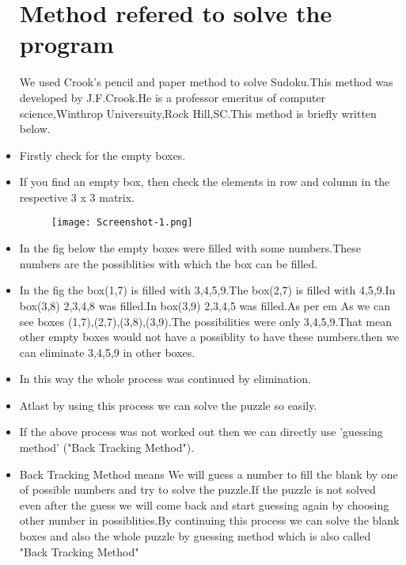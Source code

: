 \documentclass[12pt]{article}
\begin{document}
\begin{itemize}
\section{Method refered to solve the program}
 We used Crook's pencil and paper method to solve Sudoku.This method was developed by J.F.Crook.He is a professor emeritus of computer science,Winthrop Universuity,Rock Hill,SC.This method is briefly written below.
\item Firstly check for the empty boxes. 
\item If you find an empty box, then check  the elements in row and column in the respective 3 x 3 matrix.
\begin{center}
\begin{figure}[h]
\texttt{[image: Screenshot-1.png]}
\end{figure}
\end{center}
\item In the fig below the empty boxes were filled with some numbers.These numbers are the possiblities with which the box can be filled.
\item In the fig the box(1,7) is filled with 3,4,5,9.The box(2,7) is filled with 4,5,9.In box(3,8) 2,3,4,8 was filled.In box(3,9) 2,3,4,5 was filled.As per em As we can see boxes (1,7),(2,7),(3,8),(3,9).The possibilities were only 3,4,5,9.That mean other empty boxes would not have a possiblity to have these numbers.then we can eliminate 3,4,5,9 in other boxes.
\item In this way the whole process was continued by elimination.
\item Atlast by using this process we can solve the puzzle so easily.
\item If the above process was not worked out then we can directly use 'guessing method' ("Back Tracking Method").
\item Back Tracking Method means We will guess a number to fill the blank by one of possible numbers and try to solve the puzzle.If the puzzle is not solved even after the guess we will come back and start guessing again by choosing other number in possiblities.By continuing this  
process we can solve the blank boxes and also the whole puzzle by guessing method which is also called "Back Tracking Method"


\end{itemize}
\end{document}
